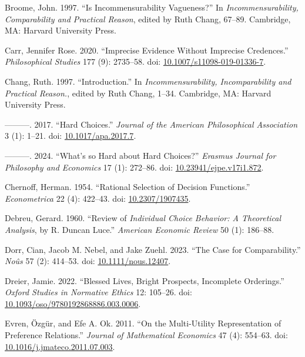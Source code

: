 \documentclass[
  11pt,
  letterpaper,
  DIV=11,
  numbers=noendperiod,
  twoside]{scrartcl}
\newlength{\cslhangindent}
\newenvironment{CSLReferences}[2] %
 {\begin{list}{}{%
  \setlength{\itemindent}{0pt}
  \setlength{\leftmargin}{0pt}
  \setlength{\parsep}{0pt}
  \ifodd #1
   \setlength{\leftmargin}{\cslhangindent}
   \setlength{\itemindent}{-1\cslhangindent}
  \fi
  \setlength{\itemsep}{#2\baselineskip}}}
 {\end{list}}
\begin{document}
\begin{CSLReferences}{1}{0}
Broome, John. 1997. {``Is Incommensurability Vagueness?''} In
\emph{Incommensurability, Comparability and Practical Reason}, edited by
Ruth Chang, 67--89. Cambridge, MA: Harvard University Press.

Carr, Jennifer Rose. 2020. {``Imprecise Evidence Without Imprecise
Credences.''} \emph{Philosophical Studies} 177 (9): 2735--58. doi:
\href{https://doi.org/10.1007/s11098-019-01336-7}{10.1007/s11098-019-01336-7}.

Chang, Ruth. 1997. {``Introduction.''} In \emph{Incommensurability,
Incomparability and Practical Reason.}, edited by Ruth Chang, 1--34.
Cambridge, MA: Harvard University Press.

---------. 2017. {``Hard Choices.''} \emph{Journal of the American
Philosophical Association} 3 (1): 1--21. doi:
\href{https://doi.org/10.1017/apa.2017.7}{10.1017/apa.2017.7}.

---------. 2024. {``What's so Hard about Hard Choices?''} \emph{Erasmus
Journal for Philosophy and Economics} 17 (1): 272--86. doi:
\href{https://doi.org/10.23941/ejpe.v17i1.872}{10.23941/ejpe.v17i1.872}.

Chernoff, Herman. 1954. {``Rational Selection of Decision Functions.''}
\emph{Econometrica} 22 (4): 422--43. doi:
\href{https://doi.org/10.2307/1907435}{10.2307/1907435}.

Debreu, Gerard. 1960. {``Review of \emph{Individual Choice Behavior: A
Theoretical Analysis}, by {R. Duncan Luce}.''} \emph{American Economic
Review} 50 (1): 186--88.

Dorr, Cian, Jacob M. Nebel, and Jake Zuehl. 2023. {``The Case for
Comparability.''} \emph{Noûs} 57 (2): 414--53. doi:
\href{https://doi.org/10.1111/nous.12407}{10.1111/nous.12407}.

Dreier, Jamie. 2022. {``Blessed Lives, Bright Prospects, Incomplete
Orderings.''} \emph{Oxford Studies in Normative Ethics} 12: 105--26.
doi:
\href{https://doi.org/10.1093/oso/9780192868886.003.0006}{10.1093/oso/9780192868886.003.0006}.

Evren, Özgür, and Efe A. Ok. 2011. {``On the Multi-Utility
Representation of Preference Relations.''} \emph{Journal of Mathematical
Economics} 47 (4): 554--63. doi:
\href{https://doi.org/10.1016/j.jmateco.2011.07.003}{10.1016/j.jmateco.2011.07.003}.


\end{CSLReferences}
\end{document}
